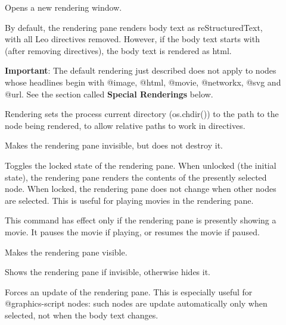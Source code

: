 \documentclass[a4paper,10pt,english]{sphinxmanual}
\begin{document}
\begin{description}
\item[{}] \leavevmode
Opens a new rendering window.

By default, the rendering pane renders body text as reStructuredText, with
all Leo directives removed. However, if the body text starts with \code{\textless{}}
(after removing directives), the body text is rendered as html.

\textbf{Important}: The default rendering just described does not apply to nodes
whose headlines begin with @image, @html, @movie, @networkx, @svg and @url.
See the section called \textbf{Special Renderings} below.

Rendering sets the process current directory (os.chdir()) to the path
to the node being rendered, to allow relative paths to work in  directives.

\item[{}] \leavevmode
Makes the rendering pane invisible, but does not destroy it.

\item[{}] \leavevmode
Toggles the locked state of the rendering pane. When unlocked (the initial
state), the rendering pane renders the contents of the presently selected
node. When locked, the rendering pane does not change when other nodes are
selected. This is useful for playing movies in the rendering pane.

\item[{}] \leavevmode
This command has effect only if the rendering pane is presently showing a movie.
It pauses the movie if playing, or resumes the movie if paused.

\item[{}] \leavevmode
Makes the rendering pane visible.

\item[{}] \leavevmode
Shows the rendering pane if invisible, otherwise hides it.

\item[{}] \leavevmode
Forces an update of the rendering pane. This is especially useful for
@graphics-script nodes: such nodes are update automatically only when
selected, not when the body text changes.

\end{description}
\end{document}
